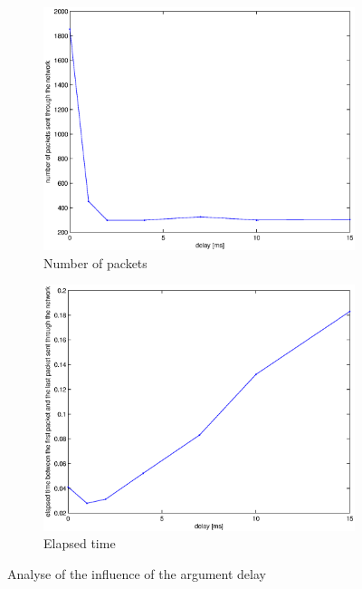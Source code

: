 \documentclass[10pt,a4paper]{article}
\begin{document}
\begin{figure}[!h]
        \centering
        \begin{subfigure}[b]{0.49\textwidth}
		\centering \includegraphics[width=\textwidth]{images/npackets.eps}
		\caption{Number of packets}
		\label{FluxSquareSum}
	\end{subfigure}
        \begin{subfigure}[b]{0.49\textwidth}
        		\centering\includegraphics[width=\textwidth]{images/time.eps}
		\caption{Elapsed time}
		\label{analyse}
	\end{subfigure}
	\caption{Analyse of the influence of the argument delay}
	\label{deltafluxvar}
\end{figure}
\end{document}
